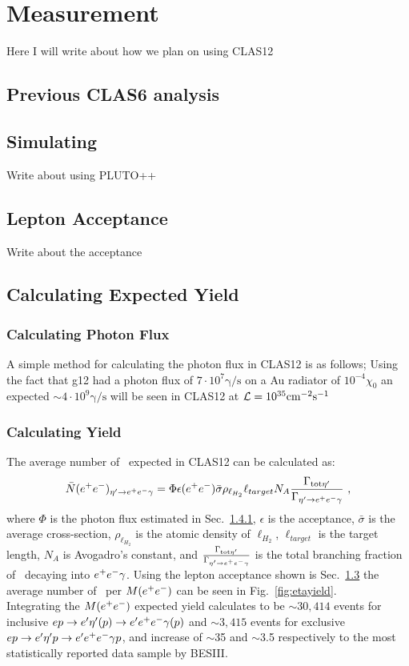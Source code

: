 \section{Measurement}\label{sec:measurement}
Here I will write about how we plan on using CLAS12
\subsection{Previous CLAS6 analysis}
\subsection{Simulating}
Write about using PLUTO++
\subsection{Lepton Acceptance}\label{sec.acceptance}
Write about the acceptance
\subsection{Calculating Expected Yield}
\subsubsection{Calculating Photon Flux}\label{sec:calflux}
A simple method for calculating the photon flux in CLAS12 is as follows; Using the fact that g12 had a photon flux of $7\cdot 10^7 \mathrm{\gamma/s}$ on a Au radiator of $10^{-4} \chi_0$ an expected $\sim 4\cdot 10^9  \mathrm{\gamma/s}$ will be seen in CLAS12 at ${\cal L} = 10^{35}\mathrm{cm^{-2}s^{-1}}$
\subsubsection{Calculating Yield}
The average number of \etaDal \ expected in CLAS12 can be calculated as:
\begin{align}
\bar{N}(e^+e^-)_{\eta^{\prime} \to e^+e^- \gamma} = \Phi \epsilon(e^+e^-)\bar{\sigma} \rho_{\ell_{H_2}}\ell_{target}N_A \frac{\Gamma_{\mathrm{tot} \eta^{\prime}}}{\Gamma_{\eta^{\prime} \to e^+e^- \gamma}}\ ,
\end{align}
where $\Phi$ is the photon flux estimated in Sec.~\ref{sec:calflux}, $\epsilon$ is the acceptance, $\bar{\sigma}$ is the average cross-section, $\rho_{\ell_{H_2}}$ is the atomic density of $\ell_{H_2}$, $\ell_{target}$ is the target length, $N_A$ is Avogadro's constant, and $\frac{\Gamma_{\mathrm{tot} \eta^{\prime}}}{\Gamma_{\eta^{\prime} \to e^+e^- \gamma}}$ is the total branching fraction of \etaTP \  decaying into $e^+e^- \gamma$.
Using the lepton acceptance shown is Sec.~\ref{sec.acceptance} the average number of \etaTP \  per $M(e^+e^-)$ can be seen in Fig.~\ref{fig:etayield}.
\label{fig:etayield}\\
Integrating the $M(e^+e^-)$ expected yield calculates to be $\sim 30,414$ events for inclusive $ep\to e'\eta^{\prime} (p) \to e'e^+e^- \gamma(p)$ and $\sim 3,415$ events for exclusive $ep\to e'\eta^{\prime} p \to e'e^+e^- \gamma p$, and increase of $\sim$35 and $\sim$3.5 respectively to the most statistically reported data sample by BESIII. 
